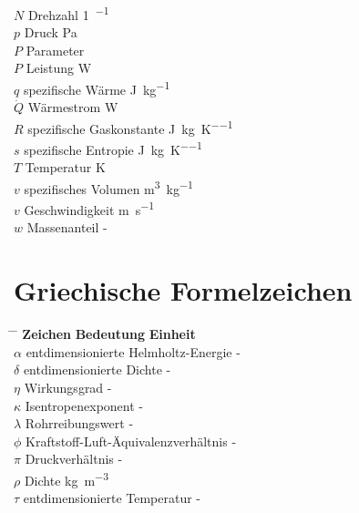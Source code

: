 \begin{tabbing}
    $N$         \>  Drehzahl                            \>  \si{1\per\min} \\
    $p$         \>  Druck                               \>  \si{\Pa}  \\
    $P$         \>  Parameter                           \>   \\
    $P$         \>  Leistung                            \>  \si{\W}   \\
    $q$         \>  spezifische Wärme                   \>  \si{\J\per\kg} \\
    $\dot{Q}$   \>  Wärmestrom                          \>  \si{\W}   \\
    $R$         \>  spezifische Gaskonstante            \>  \si{\J\per\kg\per\K} \\
    $s$         \>  spezifische Entropie                \>  \si{\J\per\kg\per\K} \\
    $T$         \>  Temperatur                          \>  \si{\K}   \\ 
    $v$         \>  spezifisches Volumen                \>  \si{\m\cubed\per\kg} \\
    $v$         \>  Geschwindigkeit                     \>  \si{\m\per\s} \\
    $w$         \>  Massenanteil                        \>  -   \\
\end{tabbing}

\section*{Griechische Formelzeichen}

\begin{tabbing}
	\hspace*{3cm} \= \hspace*{8cm} \= \hspace*{2cm}\kill
	\textbf{Zeichen} \> \textbf{Bedeutung} 				\>	\textbf{Einheit}		\\[5mm]
	$\alpha$    \>  entdimensionierte Helmholtz-Energie \>  -  \\
    $\delta$    \>  entdimensionierte Dichte            \>  -  \\
    $\eta$		\>	Wirkungsgrad						\>	-  \\
	$\kappa$	\>	Isentropenexponent					\>	-  \\
    $\lambda$   \>  Rohrreibungswert                    \>  -  \\
    $\phi$      \>  Kraftstoff-Luft-Äquivalenzverhältnis \> -  \\
	$\pi$		\>	Druckverhältnis						\>	-  \\
	$\rho$	    \>	Dichte								\>     \si{\kg\per\cubic\m}	\\
    $\tau$      \>  entdimensionierte Temperatur        \>  -  \\
\end{tabbing}

